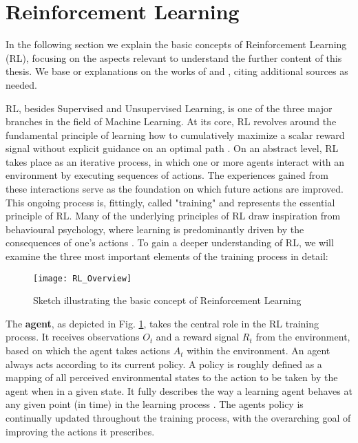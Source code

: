 \section{Reinforcement Learning} \label{sec: Reinforcement Learning}
In the following section we explain the basic concepts of Reinforcement Learning (RL), focusing on the aspects relevant to understand the further content of this thesis.
We base or explanations on the works of \cite{sutton2018reinforcement} and \cite{silver2015}, citing additional sources as needed.

RL, besides Supervised and Unsupervised Learning, is one of the three major branches in the field of Machine Learning.
At its core, RL revolves around the fundamental principle of learning how to cumulatively maximize a scalar reward signal without explicit guidance on an optimal path \parencite{sutton2018reinforcement}.
On an abstract level, RL takes place as an iterative process, in which one or more agents interact with an environment by executing sequences of actions.
The experiences gained from these interactions serve as the foundation on which future actions are improved.
This ongoing process is, fittingly, called "training" and represents the essential principle of RL.
Many of the underlying principles of RL draw inspiration from behavioural psychology, where learning is predominantly driven by the consequences of one's actions \parencite{sutton2018reinforcement, joshi2021reinforcement}.
To gain a deeper understanding of RL, we will examine the three most important elements of the training process in detail:

\begin{figure}[h]
	\centerline{\texttt{[image: RL\_Overview]}}
	\caption[RL concept illustration]{Sketch illustrating the basic concept of Reinforcement Learning}
	\label{figure: RL Illustration}
\end{figure}


The \textbf{agent}, as depicted in Fig. \ref{figure: RL Illustration}, takes the central role in the RL training process.
It receives observations $O_t$ and a reward signal $R_t$ from the environment, based on which the agent takes actions $A_t$ within the environment.
An agent always acts according to its current policy.
A policy is roughly defined as a mapping of all perceived environmental states to the action to be taken by the agent when in a given state.
It fully  describes the way a learning agent behaves at any given point (in time) in the learning process \parencite{sutton2018reinforcement, silver2015}.
The agents policy is continually updated throughout the training process, with the overarching goal of improving the actions it prescribes.

